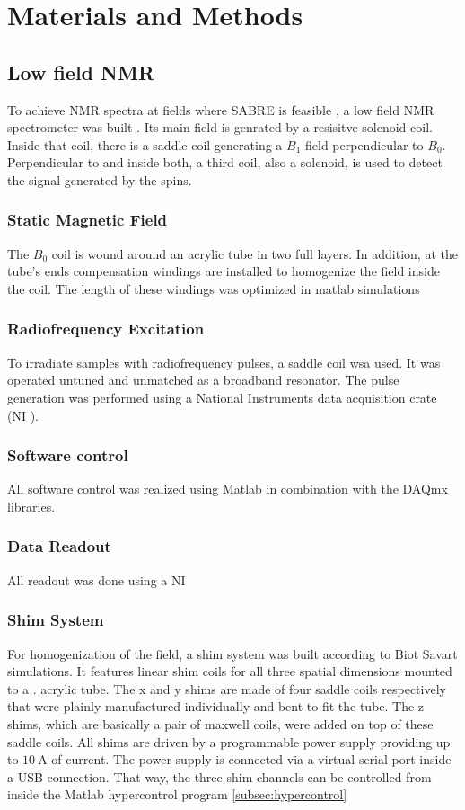 \chapter{Materials and Methods}\label{chap:MaterialsAndMethods}
	\section{Low field NMR}
		To achieve NMR spectra at fields where SABRE is feasible , a low field NMR
		spectrometer was built . Its main field is genrated by a resisitve solenoid
		coil. Inside that coil, there is a saddle coil
		generating a $B_1$ field perpendicular to $B_0$. Perpendicular to and inside both, a third
		coil, also a solenoid, is used to detect the signal generated by the spins.
		\subsection{Static Magnetic Field}
			The $B_0$ coil is wound around an acrylic tube in two full layers. In addition, at the
			tube's ends compensation windings are installed to homogenize the field inside the coil.
			The length of these windings was optimized in matlab simulations 
		\subsection{Radiofrequency Excitation}
			To irradiate samples with radiofrequency pulses, a saddle coil  wsa
			used. It was operated untuned and unmatched as a broadband resonator. The pulse
			generation was performed using a National Instruments data acquisition crate (NI
			). 
		\subsection{Software control}
			All software control was realized using Matlab in combination with the DAQmx libraries. 
		\subsection{Data Readout}
			All readout was done using a NI 
		\subsection{Shim System}
			For homogenization of the field, a shim system was built according to Biot Savart
			simulations. It features linear shim coils for all three spatial dimensions mounted to a
			. acrylic tube. The x and y shims are made of four saddle coils respectively that
			were plainly manufactured individually and bent to fit the tube. The z shims, which are
			basically a pair of maxwell coils, were added on top of these saddle coils. All shims
			are driven by a  programmable power supply providing up to
			$\SI{10}{\ampere}$ of current. The power supply is connected via a virtual serial port inside
			a USB connection. That way, the three shim channels can be controlled from inside the
			Matlab hypercontrol program \ref{subsec:hypercontrol}

